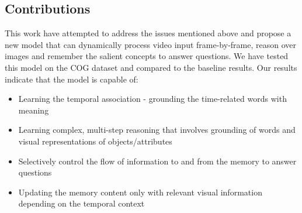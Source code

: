 \subsection{Contributions}
This work have attempted to address the issues mentioned above and propose a new model that can dynamically process video input frame-by-frame, reason over images and remember the salient concepts to answer questions.  We have tested this model on the COG dataset \cite{yang2018dataset} and compared to the baseline results.  Our results indicate that the model is capable of:
\begin{itemize}
\item Learning the temporal association - grounding the time-related words with meaning

\item Learning complex, multi-step reasoning that involves grounding of words and visual representations of objects/attributes
\item Selectively control the flow of information to and from the memory to answer questions
\item Updating the memory content only with relevant visual information depending on the temporal context

\end{itemize}







